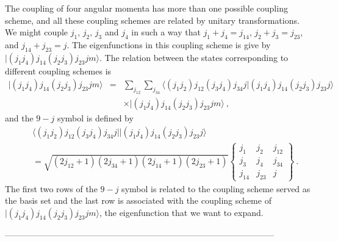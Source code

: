 The coupling of four angular momenta has more than one possible coupling scheme, and all these coupling schemes are related by unitary transformations. We might couple $j_{1}$, $j_{2}$, $j_{3}$ and $j_{4}$ in such a way that $j_{1} + j_{4}=j_{14}$, $j_{2} + j_{3}= j_{23}$, and $j_{14} + j_{23} = j$. The eigenfunctions in this coupling scheme is give by $|(j_{1}j_{4})j_{14}(j_{2}j_{3})j_{23}jm \rangle$. The relation between the states corresponding to different coupling schemes is
\begin{eqnarray}
|(j_{1}j_{4})j_{14}(j_{2}j_{3})j_{23}jm \rangle &=& \sum_{j_{12}}\sum_{j_{34}} \langle (j_{1}j_{2})j_{12}(j_{3}j_{4})j_{34}j  | (j_{1}j_{4})j_{14}(j_{2}j_{3})j_{23}j \rangle \nonumber \\
& & \times |(j_{1}j_{4})j_{14}(j_{2}j_{3})j_{23}jm \rangle \ , \label{9-j1}
\end{eqnarray}
and the $9-j$ symbol is defined by
\begin{eqnarray}
&&\langle (j_{1}j_{2})j_{12}(j_{3}j_{4})j_{34}j | |(j_{1}j_{4})j_{14}(j_{2}j_{3})j_{23}j \rangle \nonumber \\
& & = \sqrt{(2j_{12} + 1) (2j_{34} +1)(2j_{14}+1)(2j_{23} + 1)}
\left\{
\begin{array}{ccc}
j_{1}& j_{2}&j_{12} \\
j_{3}&j_{4}&j_{34} \\
j_{14}&j_{23}&j 
\end{array}
\right\} \ . \label{9-j2}
\end{eqnarray}
The first two rows of the $9-j$ symbol is related to the coupling scheme served as the basis set and the last row is associated with the coupling scheme of $|(j_{1}j_{4})j_{14}(j_{2}j_{3})j_{23}jm \rangle$, the eigenfunction that we want to expand. 

-----------------------------------------------------------------------------------------------

